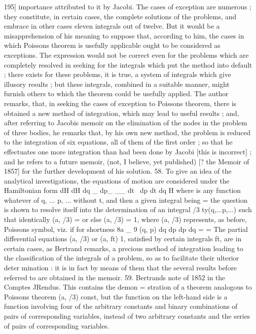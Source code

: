 \documentclass[12pt,a4paper]{article}
\theoremstyle{definition}
\begin{document}
195]
importance attributed to it by Jacobi. The cases of exception are numerous ; they
constitute, in certain cases, the complete solutions of the problems, and embrace in
other cases eleven integrals out of twelve. But it would be a misapprehension of his
meaning to suppose that, according to him, the cases in which Poissons theorem is
usefully applicable ought to be considered as exceptions. The expression would not be
correct even for the problems which are completely resolved in seeking for the integrals
which put the method into default ; there exists for these problems, it is true, a
system of integrals which give illusory results ; but these integrals, combined in a
suitable manner, might furnish others to which the theorem could be usefully applied.
The author remarks, that, in seeking the cases of exception to Poissons theorem,
there is obtained a new method of integration, which may lead to useful results ;
and, after referring to Jacobis memoir on the elimination of the nodes in the problem
of three bodies, he remarks that, by his own new method, the problem is reduced
to the integration of six equations, all of them of the first order ; so that he
effectuates one more integration than had been done by Jacobi [this is incorrect] ;
and he refers to a future memoir, (not, I believe, yet published) [? the Memoir of
1857] for the further development of his solution.
58. To give an idea of the analytical investigations, the equations of motion are
considered under the Hamiltonian form
dH dH
dq _ dp_
__
dt~ dp dt dq
H
where is any function whatever of q, ... p, ... without t, and then a given integral
being
=
the question is shown to resolve itself into the determination of an integral /3 ty(q,...p,...)
such that identically (a, /3) = or else (a, /3) = 1, where (a, /3) represents, as before,
Poissons symbol, viz.
if for shortness
8a _
9 (q, p) dq dp dp dq
= =
The partial differential equations (a, /3) or (a, ft) 1, satisfied by certain integrals ft,
are in certain cases, as Bertrand remarks, a precious method of integration leading to
the classification of the integrals of a problem, so as to facilitate their ulterior deter
mination : it is in fact by means of them that the several results before referred to
are obtained in the memoir.
59. Bertrands note of 1852 in the Comptes JRendus. This contains the demon
=
stration of a theorem analogous to Poissons theorem (a, /3) const, but the function
on the left-hand side is a function involving four of the arbitrary constants and
binary combinations of pairs of corresponding variables, instead of two arbitrary constants
and the series of pairs of corresponding variables.
\end{document}
